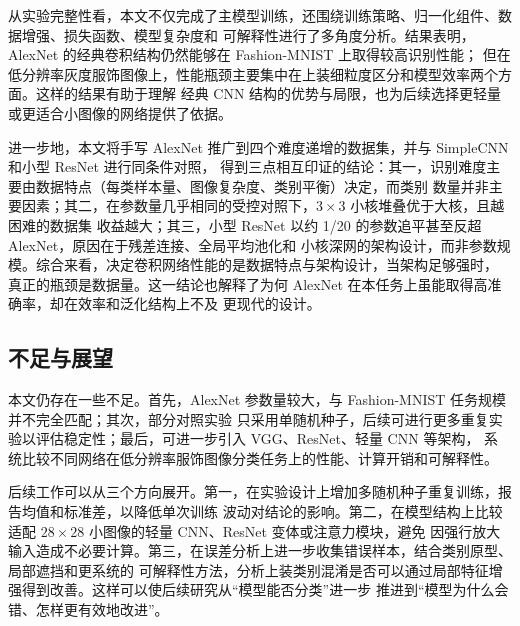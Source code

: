 \documentclass[12pt,a4paper,fontset=fandol]{ctexart}
\numberwithin{figure}{section}
\numberwithin{table}{section}
\numberwithin{equation}{section}
\begin{document}
从实验完整性看，本文不仅完成了主模型训练，还围绕训练策略、归一化组件、数据增强、损失函数、模型复杂度和
可解释性进行了多角度分析。结果表明，AlexNet 的经典卷积结构仍然能够在 Fashion-MNIST 上取得较高识别性能；
但在低分辨率灰度服饰图像上，性能瓶颈主要集中在上装细粒度区分和模型效率两个方面。这样的结果有助于理解
经典 CNN 结构的优势与局限，也为后续选择更轻量或更适合小图像的网络提供了依据。

进一步地，本文将手写 AlexNet 推广到四个难度递增的数据集，并与 SimpleCNN 和小型 ResNet 进行同条件对照，
得到三点相互印证的结论：其一，识别难度主要由数据特点（每类样本量、图像复杂度、类别平衡）决定，而类别
数量并非主要因素；其二，在参数量几乎相同的受控对照下，$3\times3$ 小核堆叠优于大核，且越困难的数据集
收益越大；其三，小型 ResNet 以约 1/20 的参数追平甚至反超 AlexNet，原因在于残差连接、全局平均池化和
小核深网的架构设计，而非参数规模。综合来看，决定卷积网络性能的是数据特点与架构设计，当架构足够强时，
真正的瓶颈是数据量。这一结论也解释了为何 AlexNet 在本任务上虽能取得高准确率，却在效率和泛化结构上不及
更现代的设计。

\subsection{不足与展望}
本文仍存在一些不足。首先，AlexNet 参数量较大，与 Fashion-MNIST 任务规模并不完全匹配；其次，部分对照实验
只采用单随机种子，后续可进行更多重复实验以评估稳定性；最后，可进一步引入 VGG、ResNet、轻量 CNN 等架构，
系统比较不同网络在低分辨率服饰图像分类任务上的性能、计算开销和可解释性。

后续工作可以从三个方向展开。第一，在实验设计上增加多随机种子重复训练，报告均值和标准差，以降低单次训练
波动对结论的影响。第二，在模型结构上比较适配 $28\times28$ 小图像的轻量 CNN、ResNet 变体或注意力模块，避免
因强行放大输入造成不必要计算。第三，在误差分析上进一步收集错误样本，结合类别原型、局部遮挡和更系统的
可解释性方法，分析上装类别混淆是否可以通过局部特征增强得到改善。这样可以使后续研究从“模型能否分类”进一步
推进到“模型为什么会错、怎样更有效地改进”。

\end{document}
